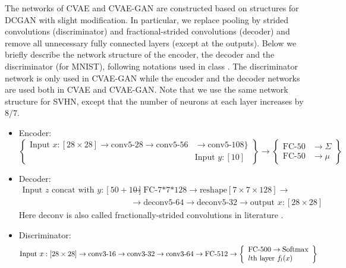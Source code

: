 \documentclass[10pt]{article}
\begin{document}
The networks of CVAE and CVAE-GAN are constructed based on structures for DCGAN \cite{alec2016dcgan} with slight modification. In particular, we replace pooling by strided convolutions (discriminator) and fractional-strided convolutions (decoder) and remove all unnecessary fully connected layers (except at the outputs). Below we briefly describe the network structure of the encoder, the decoder and the discriminator (for MNIST), following notations used in class \cite{class}. The discriminator network is only used in CVAE-GAN while the encoder and the decoder networks are used both in CVAE and CVAE-GAN. Note that we use the same network structure for SVHN, except that the number of neurons at each layer increases by $8/7$.
\begin{itemize}
	\item Encoder:
  \[
   \left\{\begin{array}{lr}
        \text{Input } x:[28\times 28]\to \text{conv5-28} \to \text{conv5-56} &\to \text{conv5-108}\}\\
        &\text{Input } y:[10]
        \end{array}\right\} \to
        \left\{\begin{array}{lr}
        \text{FC-50}&\to \Sigma\\
        \text{FC-50}&\to \mu
        \end{array}\right\}
  \]

	\item Decoder:
\begin{align}
\text{Input } z \text{ concat with } y: [50 + 10] &\to \text{FC-7*7*128} \to \text{reshape}[7\times 7\times 128] \to \\
&\to \text{deconv5-64} \to \text{deconv5-32} \to \text{output } x:[28\times 28]
\end{align}
Here deconv is also called fractionally-strided convolutions in literature \cite{alec2016dcgan}.
\item Discriminator:
\[
\text{Input } x: [28\times 28] \to \text{conv3-16} \to \text{conv3-32} \to \text{conv3-64} \\
\to \text{FC-512} \to \left\{\begin{array}{lr}
        \text{FC-500}\to \text{Softmax}\\
        \text{$l$th layer $f_l(x)$}
        \end{array}\right\}
\]
\end{itemize}
\end{document}
